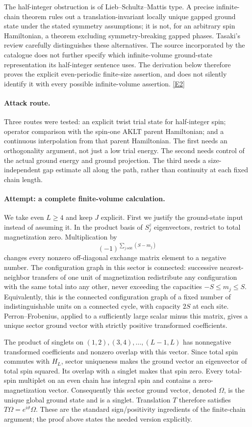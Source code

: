 \documentclass[11pt,a4paper]{article}
\newcommand{\eref}[2]{\hyperlink{extra:#1:#2}{[E#2]}}
\numberwithin{equation}{section}
\begin{document}
The half-integer obstruction is of Lieb--Schultz--Mattis type. A precise
infinite-chain theorem rules out a translation-invariant locally unique
gapped ground state under the stated symmetry assumptions; it is not, for
an arbitrary spin Hamiltonian, a theorem excluding symmetry-breaking
gapped phases. Tasaki's review carefully distinguishes these alternatives.
The source incorporated by the catalogue does not further specify which
infinite-volume ground-state representation its half-integer sentence uses.
The derivation below therefore proves the explicit even-periodic
finite-size assertion, and does not silently identify it with every possible
infinite-volume assertion. \eref{30006733}{2}

\paragraph{Attack route.}
Three routes were tested: an explicit twist trial state for half-integer
spin; operator comparison with the spin-one AKLT parent Hamiltonian; and a
continuous interpolation from that parent Hamiltonian. The first needs an
orthogonality argument, not just a low trial energy. The second needs control
of the actual ground energy and ground projection. The third needs a
size-independent gap estimate all along the path, rather than continuity
at each fixed chain length.

\paragraph{Attempt: a complete finite-volume calculation.}
We take even $L\geq4$ and keep $J$ explicit. First we justify the ground-state
input instead of assuming it. In the product basis of $S_j^z$ eigenvectors,
restrict to total magnetization zero. Multiplication by
\[
 (-1)^{\sum_{j\ \mathrm{odd}}(S-m_j)}
\]
changes every nonzero off-diagonal exchange matrix element to a negative
number. The configuration graph in this sector is connected: successive
nearest-neighbor transfers of one unit of magnetization redistribute any
configuration with the same total into any other, never exceeding the
capacities $-S\leq m_j\leq S$. Equivalently, this is the connected configuration
graph of a fixed number of indistinguishable units on a connected cycle,
with capacity $2S$ at each site. Perron--Frobenius, applied to a sufficiently
large scalar minus this matrix, gives a unique sector ground vector with
strictly positive transformed coefficients.

The product of singlets on $(1,2),(3,4),\ldots,(L-1,L)$ has nonnegative
transformed coefficients and nonzero overlap with this vector. Since total
spin commutes with $H_L$, sector uniqueness makes the ground vector an
eigenvector of total spin squared. Its overlap with a singlet makes that
spin zero. Every total-spin multiplet on an even chain has integral spin
and contains a zero-magnetization vector. Consequently this sector ground
vector, denoted $\Omega$, is the unique global ground state and is a
singlet. Translation $T$ therefore satisfies $T\Omega=e^{i\vartheta}\Omega$.
These are the standard sign/positivity ingredients of the finite-chain
argument; the proof above states the needed version explicitly.
\end{document}
